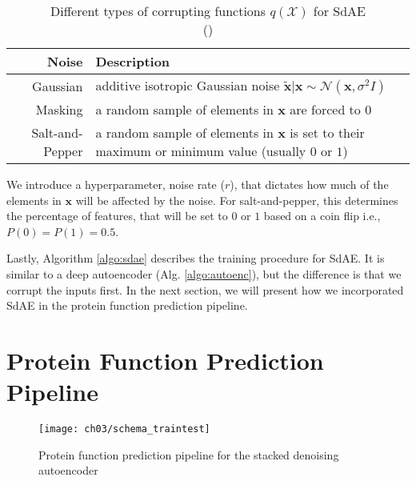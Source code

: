 \begin{table}[!h]
  \centering
  \caption[Different types of corrupting functions $q(\mathcal{X})$ for SdAE]
  {Different types of corrupting functions $q(\mathcal{X})$ for SdAE\\
  (\cite{vincent2010stacked})}
  \label{exp:noise_types}
  \begin{tabular}{@{}rp{}@{}}
      \toprule
      Noise            & Description                                                   \\ \midrule
      Gaussian         & additive isotropic Gaussian noise $\mathbf{\widetilde{x}} |
                         \mathbf{x} \sim \mathcal{N}(\mathbf{x}, \sigma^2 I)$          \\
      Masking          & a random sample of elements in $\mathbf{x}$ are forced to $0$ \\
      Salt-and-Pepper  & a random sample of elements in $\mathbf{x}$ is set to their
                         maximum or minimum value (usually $0$ or $1$)                 \\\bottomrule
  \end{tabular}
\end{table}

\par We introduce a hyperparameter, noise rate ($r$), that dictates how much of
the elements in $\mathbf{x}$ will be affected by the noise. For
salt-and-pepper, this determines the percentage of features, that will be set
to $0$ or $1$ based on a coin flip i.e., $P(0) = P(1) = 0.5$.

\par Lastly, Algorithm \ref{algo:sdae} describes the training procedure for
SdAE.  It is similar to a deep autoencoder (Alg. \ref{algo:autoenc}), but the
difference is that we corrupt the inputs first. In the next section, we will
present how we incorporated SdAE in the protein function prediction pipeline.



\section{Protein Function Prediction Pipeline}
\label{SDPipeline}

\begin{figure}[!t]
  \centering
  \texttt{[image: ch03/schema\_traintest]}
  \caption[Protein function prediction pipeline]{Protein function prediction
  pipeline for the stacked denoising autoencoder}
  \label{schema:traintest_sdae}
\end{figure}


